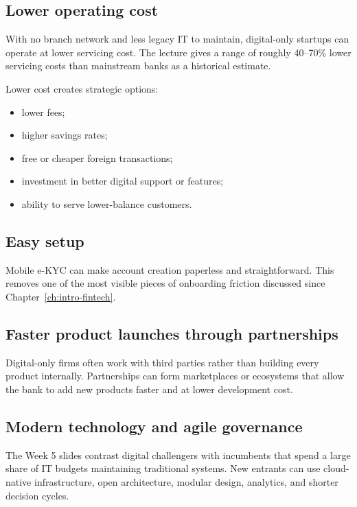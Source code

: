 \subsection{Lower operating cost}

With no branch network and less legacy IT to maintain, digital-only startups can operate at lower servicing cost. The lecture gives a range of roughly 40--70\% lower servicing costs than mainstream banks as a historical estimate.

Lower cost creates strategic options:

\begin{itemize}
  \item lower fees;
  \item higher savings rates;
  \item free or cheaper foreign transactions;
  \item investment in better digital support or features;
  \item ability to serve lower-balance customers.
\end{itemize}

\subsection{Easy setup}

Mobile e-KYC can make account creation paperless and straightforward. This removes one of the most visible pieces of onboarding friction discussed since Chapter~\ref{ch:intro-fintech}.

\subsection{Faster product launches through partnerships}

Digital-only firms often work with third parties rather than building every product internally. Partnerships can form marketplaces or ecosystems that allow the bank to add new products faster and at lower development cost.

\subsection{Modern technology and agile governance}

The Week 5 slides contrast digital challengers with incumbents that spend a large share of IT budgets maintaining traditional systems. New entrants can use cloud-native infrastructure, open architecture, modular design, analytics, and shorter decision cycles.

